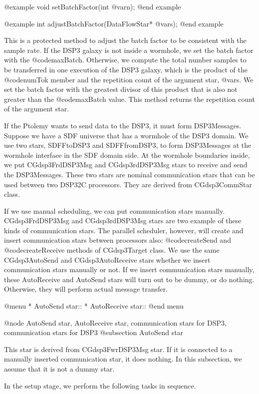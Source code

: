 {@example
void setBatchFactor(int @var{n});
@end example

@example
int adjustBatchFactor(DataFlowStar* @var{s});
@end example

This is a protected method to adjust the batch factor to be consistent with
the sample rate. If the DSP3 galaxy is not inside a wormhole, we set the
batch factor with the @code{maxBatch}. Otherwise, we compute the
total number samples to be transferred in one execution of the DSP3 galaxy,
which is the product of the @code{numTok} member and the repetition count
of the argument star, @var{s}. We set the batch factor with the greatest
divisor of this product that is also not greater than the @code{maxBatch}
value. This method returns the repetition count of the argument star.

If the Ptolemy wants to send data to the DSP3, it must form DSP3Messages.
Suppose we have a SDF universe that has a wormhole of the DSP3 domain.
We use two stars, SDFFtoDSP3 and SDFFfromDSP3, to form DSP3Messages
at the wormhole interface in the SDF domain side. At the wormhole boundaries
inside, we put CGdsp3FrdDSP3Msg and CGdsp3rdDSP3Msg stars to receive and send
the DSP3Messages. These two stars are nominal communication stars that can
be used between two DSP32C processors. They are derived from 
CGdsp3CommStar class.

If we use manual scheduling, we can put communication stars manually.
CGdsp3FrdDSP3Msg and CGdsp3rdDSP3Msg stars are two example of these kinds
of communication stars. The parallel scheduler, however, will create and insert
communication stars between processors also: @code{createSend} and
@code{createReceive} methods of CGdsp3Target class. We use the same
CGdsp3AutoSend and CGdsp3AutoReceive stars whether we insert communication
stars manually or not. If we insert communication stars manually, these
AutoReceive and AutoSend stars will turn out to be dummy, or do nothing.
Otherwise, they will perform actual message transfer.

@menu
* AutoSend star::
* AutoReceive star::
@end menu

@node AutoSend star, AutoReceive star, communication stars for DSP3, communication stars for DSP3
@subsection AutoSend star

This star is derived from CGdsp3FwrDSP3Msg star. If it is connected to a
manually inserted communication star, it does nothing. In this subsection,
we assume that it is not a dummy star.

In the setup stage, we perform the following tasks in sequence.

}
